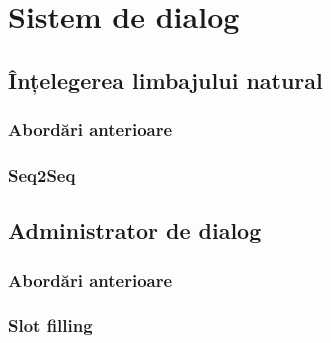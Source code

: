 \chapter{Sistem de dialog}

\section{Înțelegerea limbajului natural}

\subsection{Abordări anterioare}

\subsection{Seq2Seq}


\section{Administrator de dialog}

\subsection{Abordări anterioare}

\subsection{Slot filling}
